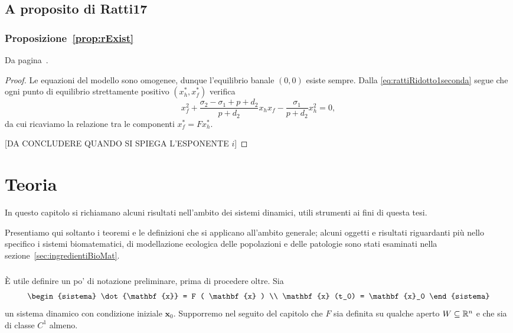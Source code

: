 \section{A proposito di Ratti17}
\subsection{ Proposizione~\ref{prop:rExist} }
Da pagina~\pageref{prop:rExist}.

\begin{proof}
    Le equazioni del modello sono omogenee, dunque l'equilibrio banale $(0,0)$ esiste sempre.
    Dalla \eqref{eq:rattiRidotto1seconda} segue che ogni punto di equilibrio strettamente positivo $(x_h^*, x_f^*)$ verifica
    $$x_f^2 + \frac{\sigma_2 - \sigma_1 + p + d_2}{p +d_2} x_h x_f - \frac{\sigma_1}{p+d_2} x_h^2 = 0,$$
    da cui ricaviamo la relazione tra le componenti $x_f^* = F x_h^*$.

    [DA CONCLUDERE QUANDO SI SPIEGA L'ESPONENTE $i$] %
\end{proof}








\chapter{Teoria}
\label{chap:teoria}
In questo capitolo si richiamano alcuni risultati nell'ambito dei sistemi dinamici, utili strumenti ai fini
di questa tesi.

Presentiamo qui soltanto i teoremi e le definizioni che si applicano all'ambito generale; alcuni oggetti
e risultati riguardanti più nello specifico i sistemi biomatematici, di modellazione ecologica delle popolazioni
e delle patologie sono stati esaminati nella sezione~\ref{sec:ingredientiBioMat}.

\paragraph{}
È utile definire un po' di notazione preliminare, prima di procedere oltre.
Sia
$$\begin{sistema}
\dot{\mathbf{x}} = F ( \mathbf{x} ) \\
\mathbf{x} (t_0) = \mathbf{x}_0
\end{sistema}$$
un sistema dinamico con condizione iniziale $\mathbf{x}_0$. Supporremo nel seguito del capitolo che $F$ sia
definita su qualche aperto $W \subseteq \mathbb{R}^n$ e che sia di classe $C^1$ almeno.

